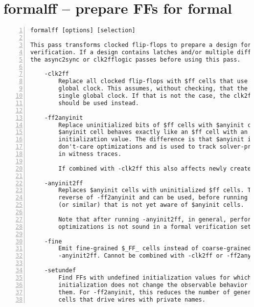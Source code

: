 \section{formalff -- prepare FFs for formal}
\label{cmd:formalff}
\begin{lstlisting}[numbers=left,frame=single]
    formalff [options] [selection]

This pass transforms clocked flip-flops to prepare a design for formal
verification. If a design contains latches and/or multiple different clocks run
the async2sync or clk2fflogic passes before using this pass.

    -clk2ff
        Replace all clocked flip-flops with $ff cells that use the implicit
        global clock. This assumes, without checking, that the design uses a
        single global clock. If that is not the case, the clk2fflogic pass
        should be used instead.

    -ff2anyinit
        Replace uninitialized bits of $ff cells with $anyinit cells. An
        $anyinit cell behaves exactly like an $ff cell with an undefined
        initialization value. The difference is that $anyinit inhibits
        don't-care optimizations and is used to track solver-provided values
        in witness traces.

        If combined with -clk2ff this also affects newly created $ff cells.

    -anyinit2ff
        Replaces $anyinit cells with uninitialized $ff cells. This performs the
        reverse of -ff2anyinit and can be used, before running a backend pass
        (or similar) that is not yet aware of $anyinit cells.

        Note that after running -anyinit2ff, in general, performing don't-care
        optimizations is not sound in a formal verification setting.

    -fine
        Emit fine-grained $_FF_ cells instead of coarse-grained $ff cells for
        -anyinit2ff. Cannot be combined with -clk2ff or -ff2anyinit.

    -setundef
        Find FFs with undefined initialization values for which changing the
        initialization does not change the observable behavior and initialize
        them. For -ff2anyinit, this reduces the number of generated $anyinit
        cells that drive wires with private names.
\end{lstlisting}

